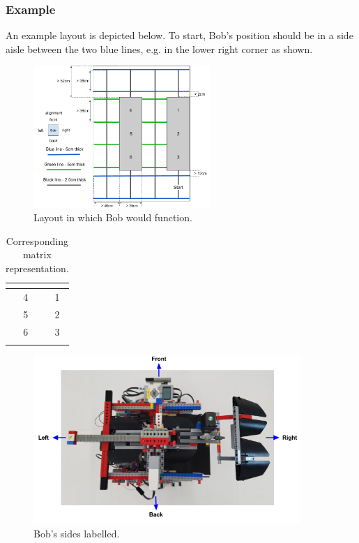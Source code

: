 \documentclass[onecolumn]{IEEEtran}
\begin{document}
\subsubsection{Example}
An example layout is depicted below. To start, Bob’s position should be in a side aisle between the two blue lines, e.g. in the lower right corner as shown.
\begin{figure}[H]
    \begin{center}
    \includegraphics[width=0.6\textwidth]{layout.png}
    \caption{Layout in which Bob would function.}
    \label{fig: figure}
    \end{center}
\end{figure}
\begin{table}[H]
\begin{center}
\begin{tabular}{| p{0.4cm} | p{0.4cm} | p{0.4cm} | p{0.4cm} |}
\hline
\textbf{ } & \textbf{ } & \textbf{ } & \textbf{ } \\
\hline
  & 4 &   & 1 \\
\hline
  & 5 &   & 2 \\
\hline
  & 6 &   & 3 \\
\hline
  &   &   &   \\
\hline
\end{tabular}
\end{center}
\caption{Corresponding matrix representation.}
\end{table}
\begin{figure}[H]
    \begin{center}
    \includegraphics[width=0.9\textwidth]{top.png}
    \caption{Bob's sides labelled.}
    \label{fig: figure}
    \end{center}
\end{figure}
\end{document}
